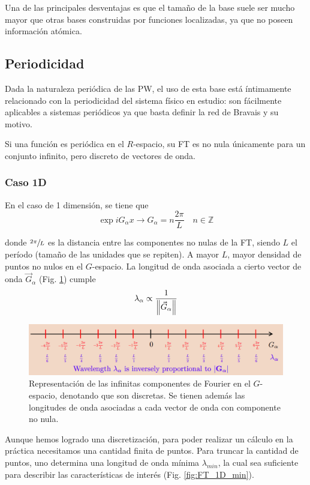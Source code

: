   Una de las principales desventajas es que el tamaño de la base suele ser mucho mayor que otras bases construidas por funciones localizadas, ya que no poseen información atómica.

\subsection{Periodicidad}

  Dada la naturaleza periódica de las PW, el uso de esta base está íntimamente relacionado con la periodicidad del sistema físico en estudio: son fácilmente aplicables a sistemas periódicos ya que basta definir la red de Bravais y su motivo.

  Si una función es periódica en el $R$-espacio, su FT es no nula únicamente para un conjunto infinito, pero discreto de vectores de onda.

\subsubsection{Caso 1D}

  En el caso de 1 dimensión, se tiene que
    $$\exp{i G_{\alpha}x} \rightarrow G_{\alpha} = n \frac{2\pi}{L} \quad n\in\mathbb{Z}$$

  donde $\sfrac{2\pi}{L}$ es la distancia entre las componentes no nulas de la FT, siendo $L$ el período (tamaño de las unidades que se repiten). A mayor $L$, mayor densidad de puntos no nulos en el $G$-espacio. La longitud de onda asociada a cierto vector de onda $\vec{G}_{\alpha}$ (Fig. \ref{fig:FT_1D}) cumple
    $$\lambda_{\alpha} \propto \frac{1}{\norm{\vec{G}_{\alpha}}}$$

  \begin{figure}[H]
      \centering
      \includegraphics[scale = 0.4]{figs/D1/FT_1D.png}
      \caption{Representación de las infinitas componentes de Fourier en el $G$-espacio, denotando que son discretas. Se tienen además las longitudes de onda asociadas a cada vector de onda con componente no nula.}
      \label{fig:FT_1D}
  \end{figure}

  Aunque hemos logrado una discretización, para poder realizar un cálculo en la práctica necesitamos una cantidad finita de puntos. Para truncar la cantidad de puntos, uno determina una longitud de onda mínima $\lambda_{min}$, la cual sea suficiente para describir las características de interés (Fig. \ref{fig:FT_1D_min}).

